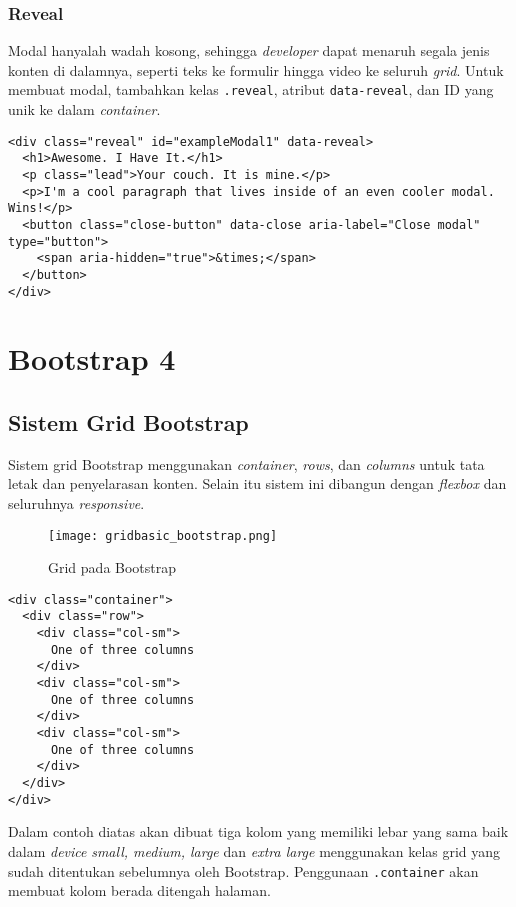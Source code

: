 \subsubsection{Reveal}
\label{subs:modals_javascript_zurb}
Modal hanyalah wadah kosong, sehingga \textit{developer} dapat menaruh segala jenis konten di dalamnya, seperti teks ke formulir hingga video ke seluruh \textit{grid}.
Untuk membuat modal, tambahkan kelas \texttt{.reveal}, atribut \texttt{data-reveal}, dan ID yang unik ke dalam \textit{container}.

\begin{lstlisting}[frame=single] 
<div class="reveal" id="exampleModal1" data-reveal>
  <h1>Awesome. I Have It.</h1>
  <p class="lead">Your couch. It is mine.</p>
  <p>I'm a cool paragraph that lives inside of an even cooler modal. Wins!</p>
  <button class="close-button" data-close aria-label="Close modal" type="button">
    <span aria-hidden="true">&times;</span>
  </button>
</div>
\end{lstlisting} 

\section{Bootstrap 4}
\subsection{Sistem Grid Bootstrap}
Sistem grid Bootstrap menggunakan \textit{container}, \textit{rows}, dan \textit{columns} untuk tata letak dan penyelarasan konten. Selain itu sistem ini dibangun dengan \textit{flexbox} dan seluruhnya \textit{responsive}.
\begin{figure} [H]
	\centering  
	\texttt{[image: gridbasic\_bootstrap.png]}  
	\caption{Grid pada Bootstrap} 
\end{figure}

\begin{lstlisting}[frame=single] 
<div class="container">
  <div class="row">
    <div class="col-sm">
      One of three columns
    </div>
    <div class="col-sm">
      One of three columns
    </div>
    <div class="col-sm">
      One of three columns
    </div>
  </div>
</div>
\end{lstlisting}
Dalam contoh diatas akan dibuat tiga kolom yang memiliki lebar yang sama baik dalam \textit{device} \textit{small, medium, large} dan \textit{extra large} menggunakan kelas grid yang sudah ditentukan sebelumnya oleh Bootstrap. Penggunaan \verb|.container| akan membuat kolom berada ditengah halaman.

